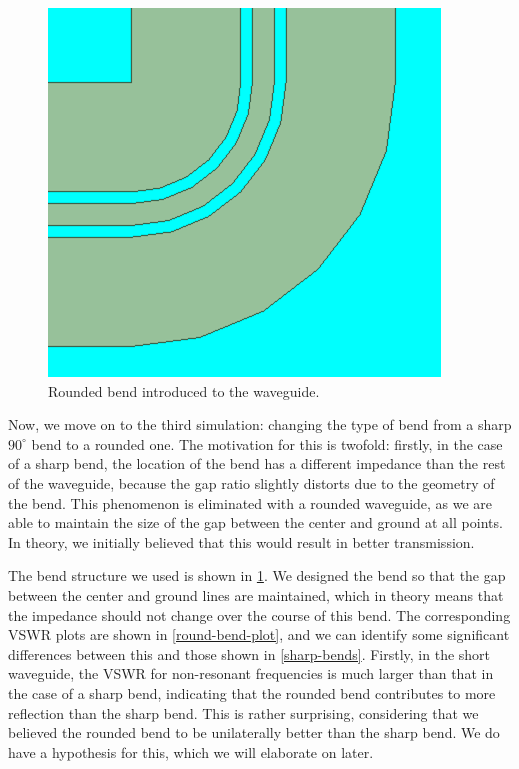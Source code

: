 \begin{figure}
	\centering
	\includegraphics[scale=0.4]{images/model/small-round-bend.png}
	\caption{Rounded bend introduced to the waveguide.}
	\label{round-bend-small}
\end{figure}

Now, we move on to the third simulation: changing the type of bend from a sharp \(
90^{\circ} \) bend to a rounded one. The motivation for this is twofold: firstly, in the case of a sharp
bend, the location of the bend has a different impedance than the rest of the waveguide, because the gap
ratio slightly distorts due to the geometry of the bend. This phenomenon is eliminated with a rounded
waveguide, as we are able to maintain the size of the gap between the center and ground at all points. In
theory, we initially believed that this would result in better transmission. 

The bend structure we used is shown in \cref{round-bend-small}. We designed the bend so that the gap between
the center and ground lines are maintained, which in theory means that the impedance should not change over
the course of this bend. The corresponding VSWR plots are shown in \cref{round-bend-plot}, and we can
identify some significant differences between this and those shown in \cref{sharp-bends}. Firstly, in the
short waveguide, the VSWR for non-resonant frequencies is much larger than that in the case of a sharp bend,
indicating that the rounded bend contributes to more reflection than the sharp bend. This is rather
surprising, considering that we believed the rounded bend to be unilaterally better than the sharp bend.
We do have a hypothesis for this, which we will elaborate on later.   

